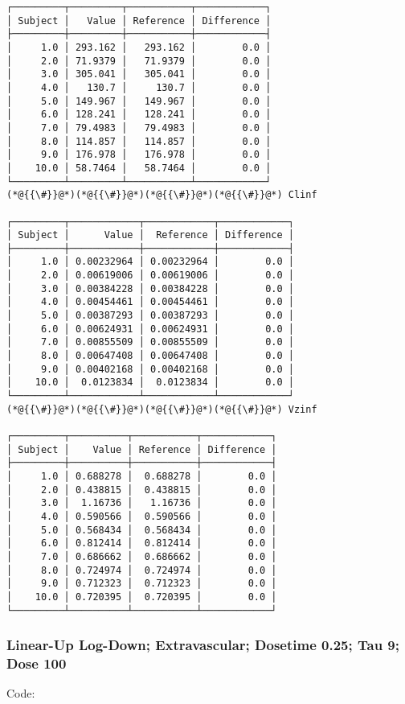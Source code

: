 \documentclass[12pt,a4paper]{article}
\begin{document}
\begin{lstlisting}
┌─────────┬─────────┬───────────┬────────────┐
│ Subject │   Value │ Reference │ Difference │
├─────────┼─────────┼───────────┼────────────┤
│     1.0 │ 293.162 │   293.162 │        0.0 │
│     2.0 │ 71.9379 │   71.9379 │        0.0 │
│     3.0 │ 305.041 │   305.041 │        0.0 │
│     4.0 │   130.7 │     130.7 │        0.0 │
│     5.0 │ 149.967 │   149.967 │        0.0 │
│     6.0 │ 128.241 │   128.241 │        0.0 │
│     7.0 │ 79.4983 │   79.4983 │        0.0 │
│     8.0 │ 114.857 │   114.857 │        0.0 │
│     9.0 │ 176.978 │   176.978 │        0.0 │
│    10.0 │ 58.7464 │   58.7464 │        0.0 │
└─────────┴─────────┴───────────┴────────────┘
(*@{{\#}}@*)(*@{{\#}}@*)(*@{{\#}}@*)(*@{{\#}}@*) Clinf

┌─────────┬────────────┬────────────┬────────────┐
│ Subject │      Value │  Reference │ Difference │
├─────────┼────────────┼────────────┼────────────┤
│     1.0 │ 0.00232964 │ 0.00232964 │        0.0 │
│     2.0 │ 0.00619006 │ 0.00619006 │        0.0 │
│     3.0 │ 0.00384228 │ 0.00384228 │        0.0 │
│     4.0 │ 0.00454461 │ 0.00454461 │        0.0 │
│     5.0 │ 0.00387293 │ 0.00387293 │        0.0 │
│     6.0 │ 0.00624931 │ 0.00624931 │        0.0 │
│     7.0 │ 0.00855509 │ 0.00855509 │        0.0 │
│     8.0 │ 0.00647408 │ 0.00647408 │        0.0 │
│     9.0 │ 0.00402168 │ 0.00402168 │        0.0 │
│    10.0 │  0.0123834 │  0.0123834 │        0.0 │
└─────────┴────────────┴────────────┴────────────┘
(*@{{\#}}@*)(*@{{\#}}@*)(*@{{\#}}@*)(*@{{\#}}@*) Vzinf

┌─────────┬──────────┬───────────┬────────────┐
│ Subject │    Value │ Reference │ Difference │
├─────────┼──────────┼───────────┼────────────┤
│     1.0 │ 0.688278 │  0.688278 │        0.0 │
│     2.0 │ 0.438815 │  0.438815 │        0.0 │
│     3.0 │  1.16736 │   1.16736 │        0.0 │
│     4.0 │ 0.590566 │  0.590566 │        0.0 │
│     5.0 │ 0.568434 │  0.568434 │        0.0 │
│     6.0 │ 0.812414 │  0.812414 │        0.0 │
│     7.0 │ 0.686662 │  0.686662 │        0.0 │
│     8.0 │ 0.724974 │  0.724974 │        0.0 │
│     9.0 │ 0.712323 │  0.712323 │        0.0 │
│    10.0 │ 0.720395 │  0.720395 │        0.0 │
└─────────┴──────────┴───────────┴────────────┘
\end{lstlisting}


\subsubsection{Linear-Up Log-Down; Extravascular; Dosetime 0.25; Tau 9; Dose 100}
Code:
\end{document}
